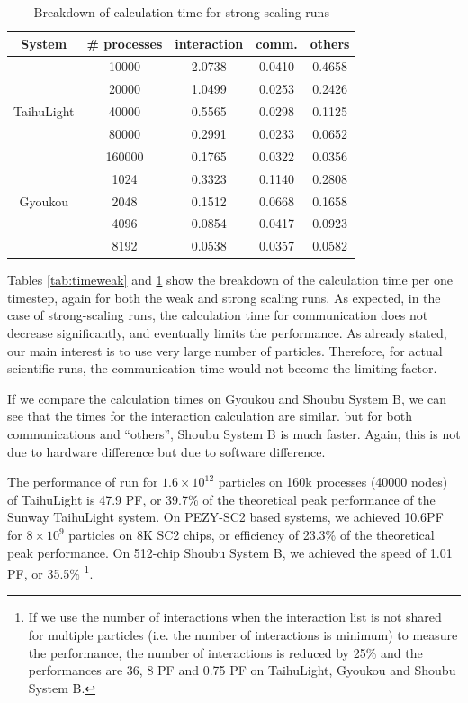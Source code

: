 \documentclass[Afour,sageh,times]{sagej}
\newcommand{\rev}[1]{{#1}}
\begin{document}
\begin{table}
\centering
  \caption{Breakdown of calculation time for strong-scaling runs}
  \label{tab:timestrong}
  \begin{tabular}{ccccc}
    \hline
 System  & \# processes & interaction & comm. & others\\
    \hline  
& 10000& 2.0738 & 0.0410 & 0.4658 \\
& 20000& 1.0499 & 0.0253 & 0.2426 \\
TaihuLight & 40000& 0.5565 & 0.0298 & 0.1125 \\
& 80000& 0.2991 & 0.0233 & 0.0652 \\
& 160000& 0.1765 & 0.0322 & 0.0356 \\
\hline
& 1024& 0.3323 & 0.1140 & 0.2808 \\
Gyoukou & 2048& 0.1512 & 0.0668 & 0.1658 \\
& 4096& 0.0854 & 0.0417 & 0.0923 \\
& 8192& 0.0538 & 0.0357 & 0.0582 \\
    \hline  
\end{tabular}
\end{table}
 
Tables \ref{tab:timeweak} and \ref{tab:timestrong} show the breakdown
of the calculation time per one timestep, again for both the weak and
strong scaling runs. As expected, in the case of strong-scaling runs,
the calculation time for communication does not decrease
significantly, and eventually limits the performance.  As already
stated, our main interest is to use very large number of
particles. Therefore, for actual scientific runs, the communication
time would not become the limiting factor.

If we compare the calculation times on Gyoukou and Shoubu System B, we
can see that the times for the interaction calculation are
similar. but for both communications and ``others'', Shoubu System B
is much faster. Again, this is not due to hardware difference but due
to software difference.


The performance of run for $1.6\times 10^{12}$ particles on 160k
processes (40000 nodes) of TaihuLight is 47.9 PF, or 39.7\% of the
theoretical peak performance of the Sunway TaihuLight system.  On
PEZY-SC2 based systems, we achieved 10.6PF for $8\times 10^{9}$
particles on 8K SC2 chips, or efficiency of 23.3\% of the theoretical
peak performance. On 512-chip Shoubu System B, we achieved the speed
of 1.01 PF, or 35.5\% \footnote{\rev{If we use the number of
    interactions when the interaction list is not shared for multiple
    particles (i.e. the number of interactions is minimum) to measure
    the performance, the number of interactions is reduced by 25\% and
    the performances are 36, 8 PF and 0.75 PF on TaihuLight, Gyoukou
    and Shoubu System B.}}.
\end{document}
